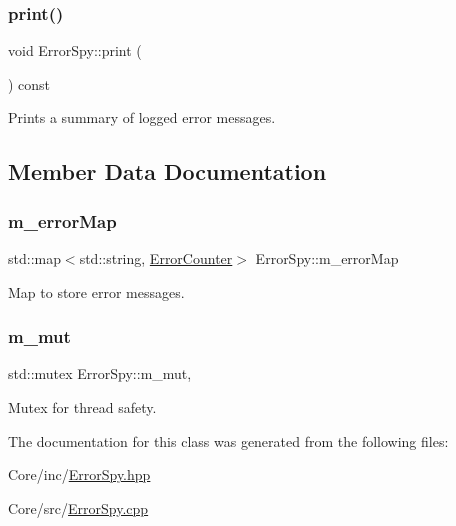 \subsubsection{\texorpdfstring{print()}{print()}}
{\footnotesize\ttfamily void Error\+Spy\+::print (\begin{DoxyParamCaption}{ }\end{DoxyParamCaption}) const}



Prints a summary of logged error messages. 



\subsection{Member Data Documentation}
\mbox{\label{class_error_spy_a4a6e0b0cb04a7382ae0d92c54c60588e}} 
\subsubsection{\texorpdfstring{m\+\_\+error\+Map}{m\_errorMap}}
{\footnotesize\ttfamily std\+::map$<$std\+::string, \hyperlink{class_error_counter}{Error\+Counter}$>$ Error\+Spy\+::m\+\_\+error\+Map\hspace{0.3cm}{\ttfamily [private]}}



Map to store error messages. 

\mbox{\label{class_error_spy_ae7d03be7562c1eb3ed4de48e33d89070}} 
\subsubsection{\texorpdfstring{m\+\_\+mut}{m\_mut}}
{\footnotesize\ttfamily std\+::mutex Error\+Spy\+::m\+\_\+mut\hspace{0.3cm}{\ttfamily [mutable]}, {\ttfamily [private]}}



Mutex for thread safety. 



The documentation for this class was generated from the following files\+:\begin{DoxyCompactItemize}
\item 
Core/inc/\hyperlink{_error_spy_8hpp}{Error\+Spy.\+hpp}\item 
Core/src/\hyperlink{_error_spy_8cpp}{Error\+Spy.\+cpp}\end{DoxyCompactItemize}

